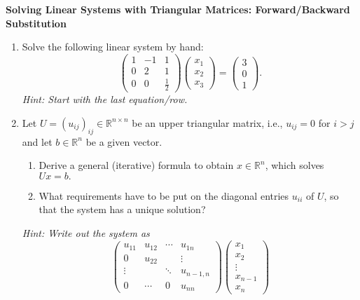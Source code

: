 \textbf{Solving Linear Systems with Triangular Matrices: Forward/Backward Substitution}
\begin{enumerate}
	\item Solve the following linear system by hand:
		$$\begin{pmatrix}
		1 & -1 & 1	\\
		0 & 2 & 1  \\
		0 & 0 & \frac{1}{2}	
		\end{pmatrix} \begin{pmatrix}
		x_1\\x_2\\x_3
		\end{pmatrix} =
		\begin{pmatrix}
		3\\0\\1
		\end{pmatrix}.$$
		\textit{Hint: Start with the last equation/row.}
	\item Let $U = (u_{ij})_{ij} \in \mathbb{R}^{n \times n}$ be an upper triangular matrix, i.e., $u_{ij} = 0$ for $i > j$ and let $b \in \mathbb{R}^n$ be a given vector.
	\begin{enumerate}
		\item Derive a general (iterative) formula to obtain $x \in \mathbb{R}^n $, which solves
		$Ux = b.$
		\item 	What requirements have to be put on the diagonal entries $u_{ii}$ of $U$, so that the system has a unique solution?
	\end{enumerate} 
	\textit{Hint: Write out the system as
	$$\begin{pmatrix}
	u_{11} & u_{12} & \cdots & u_{1n} \\
	0& u_{22} & & \vdots \\
	\vdots & & \ddots & u_{n-1,n}\\
	0 & \cdots &0 & u_{nn}
	\end{pmatrix}\begin{pmatrix}
	x_1 \\x_2\\\vdots \\x_{n-1}\\x_n

\end{pmatrix}$$}
\end{enumerate}
